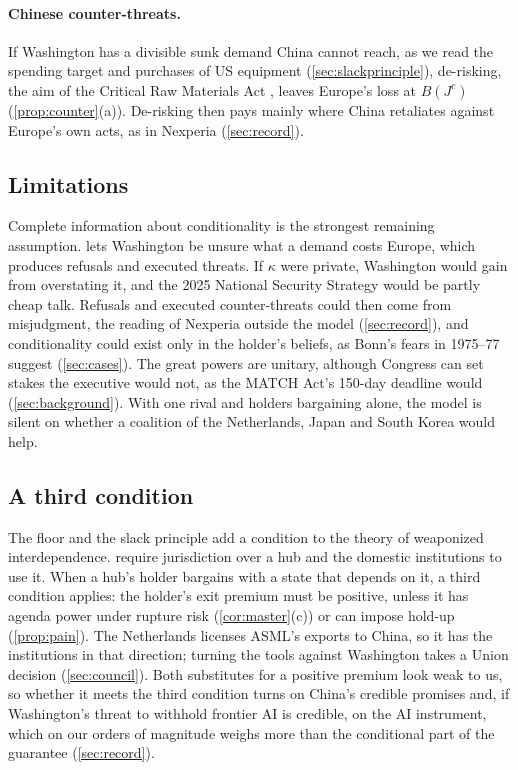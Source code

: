 \paragraph{Chinese counter-threats.} If Washington has a divisible sunk demand China cannot reach, as we read the spending target and purchases of US equipment (\cref{sec:slackprinciple}), de-risking, the aim of the Critical Raw Materials Act \citep{eu2024crma}, leaves Europe's loss at $B(J^c)$ (\cref{prop:counter}(a)). De-risking then pays mainly where China retaliates against Europe's own acts, as in Nexperia (\cref{sec:record}).

\subsection{Limitations}\label{sec:limits}

Complete information about conditionality is the strongest remaining assumption.  lets Washington be unsure what a demand costs Europe, which produces refusals and executed threats. If $\kappa$ were private, Washington would gain from overstating it, and the 2025 National Security Strategy would be partly cheap talk. Refusals and executed counter-threats could then come from misjudgment, the reading of Nexperia outside the model (\cref{sec:record}), and conditionality could exist only in the holder's beliefs, as Bonn's fears in 1975--77 suggest (\cref{sec:cases}). The great powers are unitary, although Congress can set stakes the executive would not, as the MATCH Act's 150-day deadline would (\cref{sec:background}). With one rival and holders bargaining alone, the model is silent on whether a coalition of the Netherlands, Japan and South Korea would help.

\subsection{A third condition}

The floor and the slack principle add a condition to the theory of weaponized interdependence. \citet{farrell2019weaponized} require jurisdiction over a hub and the domestic institutions to use it. When a hub's holder bargains with a state that depends on it, a third condition applies: the holder's exit premium must be positive, unless it has agenda power under rupture risk (\cref{cor:master}(c)) or can impose hold-up (\cref{prop:pain}). The Netherlands licenses ASML's exports to China, so it has the institutions in that direction; turning the tools against Washington takes a Union decision (\cref{sec:council}). Both substitutes for a positive premium look weak to us, so whether it meets the third condition turns on China's credible promises and, if Washington's threat to withhold frontier AI is credible, on the AI instrument, which on our orders of magnitude weighs more than the conditional part of the guarantee (\cref{sec:record}).
